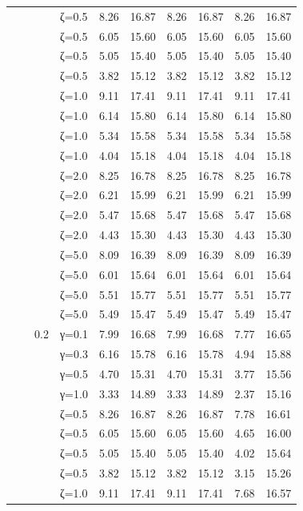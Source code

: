 \begin{table}[htbp]
\begin{tabular}{ll r l  rr  rr  rr}
  &  &  & ζ=0.5 & 8.26 & 16.87 & 8.26 & 16.87 & 8.26 & 16.87 \\
  &  &  & ζ=0.5 & 6.05 & 15.60 & 6.05 & 15.60 & 6.05 & 15.60 \\
  &  &  & ζ=0.5 & 5.05 & 15.40 & 5.05 & 15.40 & 5.05 & 15.40 \\
  &  &  & ζ=0.5 & 3.82 & 15.12 & 3.82 & 15.12 & 3.82 & 15.12 \\
  &  &  & ζ=1.0 & 9.11 & 17.41 & 9.11 & 17.41 & 9.11 & 17.41 \\
  &  &  & ζ=1.0 & 6.14 & 15.80 & 6.14 & 15.80 & 6.14 & 15.80 \\
  &  &  & ζ=1.0 & 5.34 & 15.58 & 5.34 & 15.58 & 5.34 & 15.58 \\
  &  &  & ζ=1.0 & 4.04 & 15.18 & 4.04 & 15.18 & 4.04 & 15.18 \\
  &  &  & ζ=2.0 & 8.25 & 16.78 & 8.25 & 16.78 & 8.25 & 16.78 \\
  &  &  & ζ=2.0 & 6.21 & 15.99 & 6.21 & 15.99 & 6.21 & 15.99 \\
  &  &  & ζ=2.0 & 5.47 & 15.68 & 5.47 & 15.68 & 5.47 & 15.68 \\
  &  &  & ζ=2.0 & 4.43 & 15.30 & 4.43 & 15.30 & 4.43 & 15.30 \\
  &  &  & ζ=5.0 & 8.09 & 16.39 & 8.09 & 16.39 & 8.09 & 16.39 \\
  &  &  & ζ=5.0 & 6.01 & 15.64 & 6.01 & 15.64 & 6.01 & 15.64 \\
  &  &  & ζ=5.0 & 5.51 & 15.77 & 5.51 & 15.77 & 5.51 & 15.77 \\
  &  &  & ζ=5.0 & 5.49 & 15.47 & 5.49 & 15.47 & 5.49 & 15.47 \\
  &  & 0.2 & γ=0.1 & 7.99 & 16.68 & 7.99 & 16.68 & 7.77 & 16.65 \\
  &  &  & γ=0.3 & 6.16 & 15.78 & 6.16 & 15.78 & 4.94 & 15.88 \\
  &  &  & γ=0.5 & 4.70 & 15.31 & 4.70 & 15.31 & 3.77 & 15.56 \\
  &  &  & γ=1.0 & 3.33 & 14.89 & 3.33 & 14.89 & 2.37 & 15.16 \\
  &  &  & ζ=0.5 & 8.26 & 16.87 & 8.26 & 16.87 & 7.78 & 16.61 \\
  &  &  & ζ=0.5 & 6.05 & 15.60 & 6.05 & 15.60 & 4.65 & 16.00 \\
  &  &  & ζ=0.5 & 5.05 & 15.40 & 5.05 & 15.40 & 4.02 & 15.64 \\
  &  &  & ζ=0.5 & 3.82 & 15.12 & 3.82 & 15.12 & 3.15 & 15.26 \\
  &  &  & ζ=1.0 & 9.11 & 17.41 & 9.11 & 17.41 & 7.68 & 16.57 \\

\end{tabular}
\end{table}
